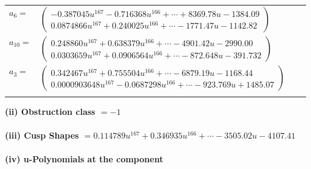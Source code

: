 \documentclass[1p]{elsarticle_modified}
\theoremstyle{definition}
\begin{document}
\begin{tabular}{m{7pt} m{180pt} m{7pt} m{180pt} }
\flushright $a_{6}=$&$\begin{pmatrix}-0.387045 u^{167}-0.716368 u^{166}+\cdots+8369.78 u-1384.09\\0.0874866 u^{167}+0.240025 u^{166}+\cdots-1771.47 u-1142.82\end{pmatrix}$ \\
\flushright $a_{10}=$&$\begin{pmatrix}0.248860 u^{167}+0.638379 u^{166}+\cdots-4901.42 u-2990.00\\0.0303659 u^{167}+0.0906564 u^{166}+\cdots-872.648 u-391.732\end{pmatrix}$ \\
\flushright $a_{3}=$&$\begin{pmatrix}0.342467 u^{167}+0.755504 u^{166}+\cdots-6879.19 u-1168.44\\0.0000903648 u^{167}-0.0687298 u^{166}+\cdots-923.769 u+1485.07\end{pmatrix}$\\&\end{tabular}
\flushleft \textbf{(ii) Obstruction class $= -1$}\\~\\
\flushleft \textbf{(iii) Cusp Shapes $= 0.114789 u^{167}+0.346935 u^{166}+\cdots-3505.02 u-4107.41$}\\~\\
\newpage\renewcommand{\arraystretch}{1}
\flushleft \textbf{(iv) u-Polynomials at the component}\newline \\
\end{document}
